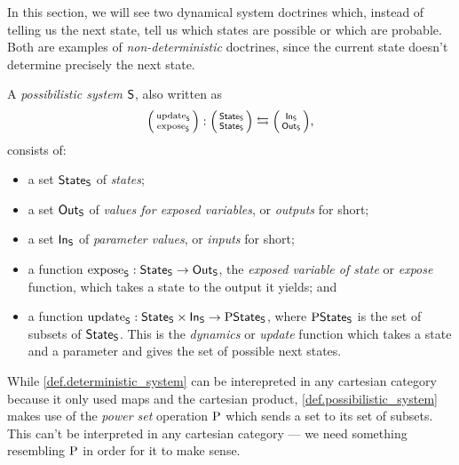 \documentclass[DynamicalBook]{subfiles}
\begin{document}
In this section, we will see two dynamical system doctrines which, instead of
telling us the next state, tell us which states are possible or which are
probable. Both are examples of \emph{non-deterministic} doctrines, since the
current state doesn't determine precisely the next state.

\begin{definition}\label{def.possibilistic_system}
  A \emph{possibilistic system} $\mathsf{S}$, also written as 
  $$\lens{\update{S}}{\expose{S}} : \lens{\State{S}}{\State{S}} \leftrightarrows \lens{\In{S}}{\Out{S}},$$ 
  consists of:
  \begin{itemize}
    \item a set $\mathsf{State}_{\mathsf{S}}$ of \emph{states};
    \item a set $\mathsf{Out}_{\mathsf{S}}$ of \emph{values for exposed variables}, or \emph{outputs}
      for short;
    \item a set $\mathsf{In}_{\mathsf{S}}$ of \emph{parameter values}, or \emph{inputs} for short;
    \item a function $\mathrm{expose}_{\mathsf{S}} : \mathsf{State}_{\mathsf{S}} \to \mathsf{Out}_{\mathsf{S}}$, the \emph{exposed variable of state} or
      \emph{expose} function, which takes a state to the output it yields; and
    \item a function $\mathrm{update}_{\mathsf{S}} : \mathsf{State}_{\mathsf{S}} \times \mathsf{In}_{\mathsf{S}} \to
      \mathrm{P}\mathsf{State}_{\mathsf{S}}$, where $\mathrm{P}\mathsf{State}_{\mathsf{S}}$ is the set of subsets of
      $\mathsf{State}_{\mathsf{S}}$. This is the \emph{dynamics} or
      \emph{update} function which takes a state and a parameter and gives the
      set of possible next states.
  \end{itemize}
\end{definition}

\begin{remark}
  While \cref{def.deterministic_system} can be interepreted in any cartesian
  category because it only used maps and the cartesian product,
  \cref{def.possibilistic_system} makes use of the \emph{power set} operation
  $\mathrm{P}$ which sends a set to its set of subsets. This can't be interpreted
  in any cartesian category --- we need something resembling $\mathrm{P}$ in order
  for it to make sense.
\end{remark}
\end{document}
